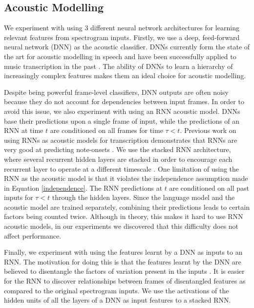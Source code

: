 \documentclass{article}
\begin{document}
\subsection{Acoustic Modelling}

We experiment with using 3 different neural network architectures for learning relevant features from spectrogram inputs. Firstly, we use a deep, feed-forward neural network (DNN) as the acoustic classifier. DNNs currently form the state of the art for acoustic modelling in speech \cite{hinton2012deep} and have been successfully applied to music transcription in the past \cite{nam2011classification,boulanger2012modeling}. The ability of DNNs to learn a hierarchy of increasingly complex features makes them an ideal choice for acoustic modelling. 

Despite being powerful frame-level classifiers, DNN outputs are often noisy because they do not account for dependencies between input frames. In order to avoid this issue, we also experiment with using an RNN acoustic model. DNNs base their predictions upon a single frame of input, while the predictions of an RNN at time $t$ are conditioned on all frames for time $\tau < t$. Previous work on using RNNs as acoustic models for transcription demonstrates that RNNs are very good at predicting note-onsets \cite{bock2012polyphonic}. We use the stacked RNN architecture, where several recurrent hidden layers are stacked in order to encourage each recurrent layer to operate at a different timescale \cite{schmidhuber1992learning}. One limitation of using the RNN as the acoustic model is that it violates the independence assumption made in Equation \ref{independence}. The RNN predictions at $t$ are conditioned on all past inputs for $\tau < t$ through the hidden layers. Since the language model and the acoustic model 
are trained separately, combining their predictions leads to certain factors being counted twice. Although in theory, this makes it hard to use RNN acoustic models, in our experiments we discovered that this difficulty does not affect performance. 

Finally, we experiment with using the features learnt by a DNN as inputs to an RNN. The motivation for doing this is that the features learnt by the DNN are believed to disentangle the factors of variation present in the inputs \cite{goodfellow2009measuring}. It is easier for the RNN to discover relationships between frames of disentangled features as compared to the original spectrogram inputs. We use the activations of the hidden units of all the layers of a DNN as input features to a stacked RNN. 
\end{document}

